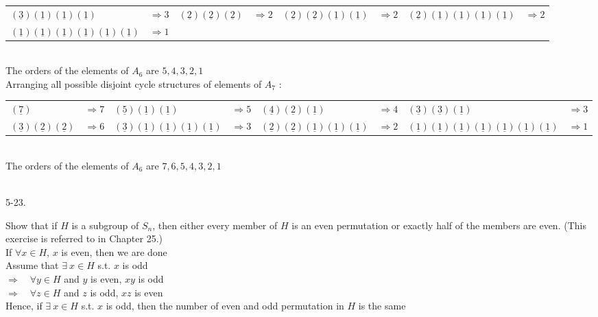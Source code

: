 \documentclass[12pt]{book}
\begin{document}
\begin{CJK}{UTF8}{bsmi}
\begin{minipage}[t]{\dimexpr\linewidth-2em}
\begin{tabular}{lc|lc|lc|lc}
    $(\underline{3})(\underline{1})(\underline{1})(\underline{1})$ & $\Rightarrow 3$ &
    $(\underline{2})(\underline{2})(\underline{2})$ & $\Rightarrow 2$ &
    $(\underline{2})(\underline{2})(\underline{1})(\underline{1})$ & $\Rightarrow 2$ &
    $(\underline{2})(\underline{1})(\underline{1})(\underline{1})(\underline{1})$ & $\Rightarrow 2$ \\
    $(\underline{1})(\underline{1})(\underline{1})(\underline{1})(\underline{1})(\underline{1})$ & $\Rightarrow 1$ 
    \end{tabular} \\
The orders of the elements of $A_6$ are $5, 4, 3, 2, 1$ \\
Arranging all possible disjoint cycle structures of elements of $A_7$ : \\
\begin{tabular}{lc|lc|lc|lc}
    $(\underline{7})$ & $\Rightarrow 7$ &
    $(\underline{5})(\underline{1})(\underline{1})$ & $\Rightarrow 5$ &
    $(\underline{4})(\underline{2})(\underline{1})$ & $\Rightarrow 4$ &
    $(\underline{3})(\underline{3})(\underline{1})$ & $\Rightarrow 3$ \\
    $(\underline{3})(\underline{2})(\underline{2})$ & $\Rightarrow 6$ &
    $(\underline{3})(\underline{1})(\underline{1})(\underline{1})(\underline{1})$ & $\Rightarrow 3$ &
    $(\underline{2})(\underline{2})(\underline{1})(\underline{1})(\underline{1})$ & $\Rightarrow 2$ &
    $(\underline{1})(\underline{1})(\underline{1})(\underline{1})(\underline{1})(\underline{1})(\underline{1})$ & $\Rightarrow 1$ 
    \end{tabular} \\
The orders of the elements of $A_6$ are $7, 6, 5, 4, 3, 2, 1$
\end{minipage} \\

5-23. \begin{minipage}[t]{\dimexpr\linewidth-2em}
Show that if $H$ is a subgroup of $S_n$, then either every member of $H$ is an even permutation or exactly half of the members are even. (This exercise is referred to in Chapter 25.) \\
If $\forall x\in H$, $x$ is even, then we are done \\
Assume that $\exists\ x\in H$ s.t. $x$ is odd \\
$\Rightarrow\quad\forall y\in H$ and $y$ is even, $xy$ is odd \\
$\Rightarrow\quad\forall z\in H$ and $z$ is odd, $xz$ is even \\
Hence, if $\exists\ x\in H$ s.t. $x$ is odd, then the number of even and odd permutation in $H$ is the same
\end{minipage} \\


\end{CJK}
\end{document}
